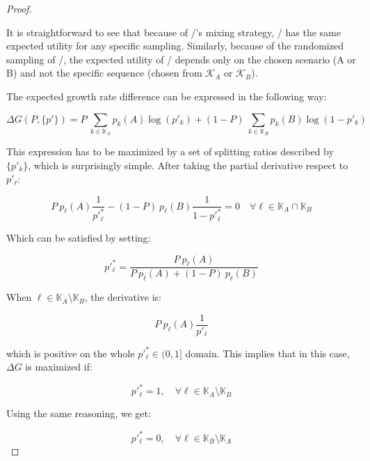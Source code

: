 \documentclass{article}
\theoremstyle{definition}
\begin{document}
\begin{proof}
\label{proof:Bayesian}

It is straightforward to see that because of \PII/'s mixing strategy, \PI/ has the same expected utility for any specific sampling.
Similarly, because of the randomized sampling of \PI/, the expected utility of \PII/ depends only on the chosen scenario (A or B) and not the specific sequence (chosen from $\mathcal{K}_A$ or $\mathcal{K}_B$).

The expected growth rate difference can be expressed in the following way:

\begin{equation}
    \label{eq:G(P,p')}
    \Delta G(P,\{p'\}) = P \ \sum_{k \in \mathbb{K}_A} p_k(A) \log(p'_k) + (1-P) \ \sum_{k \in \mathbb{K}_B} p_k(B) \log(1-p'_k)
\end{equation}

This expression has to be maximized by a set of splitting ratios described by $\{p'_k\}$, which is surprisingly simple. After taking the partial derivative respect to $p'_\ell$:

\begin{equation}
    P \ p_\ell(A) \frac{1}{p'^*_\ell} - (1-P) \ p_\ell(B) \frac{1}{1-p'^*_\ell} = 0 \quad \forall \ell \in \mathbb{K}_A \cap \mathbb{K}_B
\end{equation}

Which can be satisfied by setting:

\begin{equation}
    p'^*_\ell = \frac{P \ p_\ell(A)}{P \ p_\ell(A)+(1-P) \  p_\ell(B)}
\end{equation}

When $\ell \in \mathbb{K}_A \setminus \mathbb{K}_B$, the derivative is:

\begin{equation}
    P \ p_\ell(A) \frac{1}{p'_\ell}
\end{equation}

which is positive on the whole $p'^*_\ell \in (0,1]$ domain. This implies that in this case, $\Delta G$ is maximized if:

\begin{equation}
    p'^*_\ell = 1, \quad \forall \ell \in \mathbb{K}_A \setminus \mathbb{K}_B
\end{equation}

Using the same reasoning, we get:

\begin{equation}
    p'^*_\ell = 0, \quad \forall \ell \in \mathbb{K}_B \setminus \mathbb{K}_A
\end{equation}




\end{proof}
\end{document}
